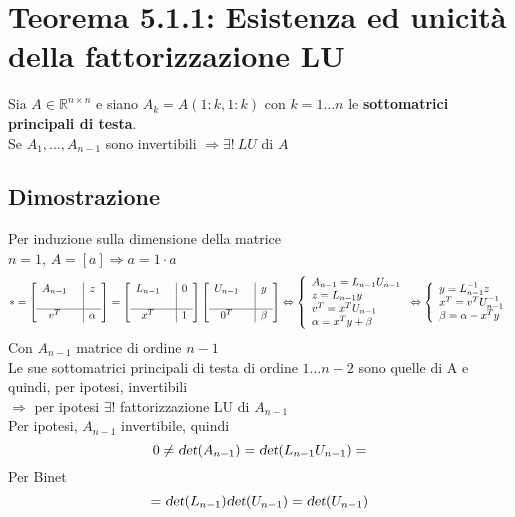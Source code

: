 \documentclass[10pt]{book}
\begin{document}
\section{Teorema 5.1.1: Esistenza ed unicità della fattorizzazione LU} Sia $A \in \mathbb{R}^{n \times n}$ e siano $A_k = A(1:k, 1:k)$ con $k = 1\ldots n$ le \textbf{sottomatrici principali di testa}.\\
Se $A_1, \ldots, A_{n-1}$ sono invertibili $\Rightarrow\exists !\: LU$ di $A$
\subsection{Dimostrazione} Per induzione sulla dimensione della matrice\\
$n = 1$, $A = [a] \Rightarrow a = 1\cdot a$
$$* = \left[ 
\begin{array}{c c | c}
	A_{n-1} & & z\\
	& &\\
	\hline
	v^T & & \alpha
\end{array}
\right]
= \left[ 
\begin{array}{c c | c}
	L_{n-1} & & 0\\
	& &\\
	\hline
	x^T & & 1
\end{array}
\right]
\left[ 
\begin{array}{c c | c}
	U_{n-1} & & y\\
	& &\\
	\hline
	0^T & & \beta
\end{array}
\right]
\Leftrightarrow
\left\{
\begin{array}{l}
A_{n-1} = L_{n-1}U_{n-1}\\
z = L_{n-1}y\\
v^T = x^T U_{n-1}\\
\alpha = x^T y + \beta
\end{array}
\right.
\Leftrightarrow
\left\{
\begin{array}{l}
y = L_{n-1}^{-1}z\\
x^T = v^T U_{n-1}^{-1}\\
\beta = \alpha - x^Ty
\end{array}
\right.
$$
Con $A_{n-1}$ matrice di ordine $n - 1$\\
Le sue sottomatrici principali di testa di ordine $1\ldots n-2$ sono quelle di A e quindi, per ipotesi, invertibili\\
$\Rightarrow$ per ipotesi $\exists !$ fattorizzazione LU di $A_{n-1}$\\
Per ipotesi, $A_{n-1}$ invertibile, quindi
$$0 \neq \textsl{det}(A_{n-1}) = \textsl{det}(L_{n-1}U_{n-1}) =$$
Per Binet
$$ = \textsl{det}(L_{n-1})\textsl{det}(U_{n-1}) = \textsl{det}(U_{n-1})$$
\end{document}
